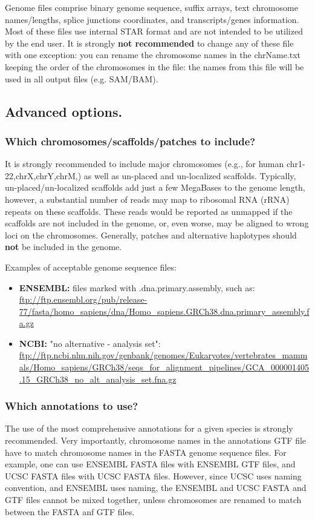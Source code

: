\documentclass[12pt]{article}
\begin{document}
Genome files comprise binary genome sequence, suffix arrays, text chromosome names/lengths, splice junctions coordinates, and transcripts/genes information. Most of these files use internal STAR format and are not intended to be utilized by the end user. It is strongly \textbf{not recommended} to change any of these file with one exception: you can rename the chromosome names in the chrName.txt keeping the order of the chromosomes in the file: the names from this file will be used in all output files (e.g. SAM/BAM).

\subsection{Advanced options.}
\subsubsection{Which chromosomes/scaffolds/patches to include?}
It is strongly recommended to include major chromosomes (e.g., for human chr1-22,chrX,chrY,chrM,) as well as un-placed and un-localized scaffolds. Typically, un-placed/un-localized scaffolds add just a few MegaBases to the genome length, however, a substantial number of reads may map to ribosomal RNA (rRNA) repeats on these scaffolds. These reads would be reported as unmapped if the scaffolds are not included in the genome, or, even worse, may be aligned to wrong loci on the chromosomes. Generally, patches and alternative haplotypes should \textbf{not} be included in the genome.

Examples of acceptable genome sequence files:
\begin{itemize}
\item \textbf{ENSEMBL:} files marked with .dna.primary.assembly, such as:
\url{ftp://ftp.ensembl.org/pub/release-77/fasta/homo_sapiens/dna/Homo_sapiens.GRCh38.dna.primary_assembly.fa.gz}
\item \textbf{NCBI:} "no alternative - analysis set": \url{ftp://ftp.ncbi.nlm.nih.gov/genbank/genomes/Eukaryotes/vertebrates_mammals/Homo_sapiens/GRCh38/seqs_for_alignment_pipelines/GCA_000001405.15_GRCh38_no_alt_analysis_set.fna.gz}
\end{itemize} 
\subsubsection{Which annotations to use?}
The use of the most comprehensive annotations for a given species is strongly recommended. Very importantly, chromosome names in the annotations GTF file have to match chromosome names in the FASTA genome sequence files. For example, one can use ENSEMBL FASTA files with ENSEMBL GTF files, and UCSC FASTA files with UCSC FASTA files. However, since UCSC uses  naming convention, and ENSEMBL uses  naming, the ENSEMBL and UCSC FASTA and GTF files cannot be mixed together, unless chromosomes are  renamed to match between the FASTA anf GTF files.
\end{document}
